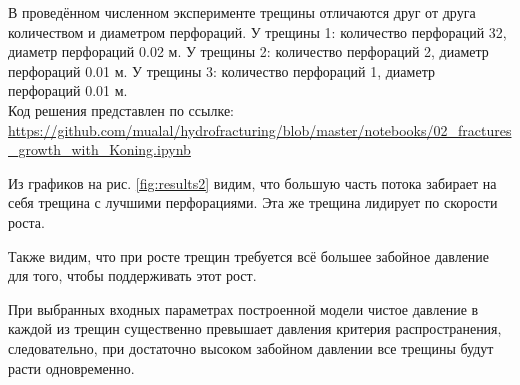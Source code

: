 В проведённом численном эксперименте трещины отличаются друг от друга количеством и диаметром перфораций.\newline
У трещины 1: количество перфораций 32, диаметр перфораций 0.02 м.\newline
У трещины 2: количество перфораций 2, диаметр перфораций 0.01 м.\newline
У трещины 3: количество перфораций 1, диаметр перфораций 0.01 м.
\\

Код решения представлен по ссылке: \url{https://github.com/mualal/hydrofracturing/blob/master/notebooks/02_fractures_growth_with_Koning.ipynb}

Из графиков на рис. \ref{fig:results2} видим, что большую часть потока забирает на себя трещина с лучшими перфорациями.
Эта же трещина лидирует по скорости роста.

Также видим, что при росте трещин требуется всё большее забойное давление для того, чтобы поддерживать этот рост.

При выбранных входных параметрах построенной модели чистое давление в каждой из трещин существенно превышает давления критерия распространения, следовательно, при достаточно высоком забойном давлении все трещины будут расти одновременно.

